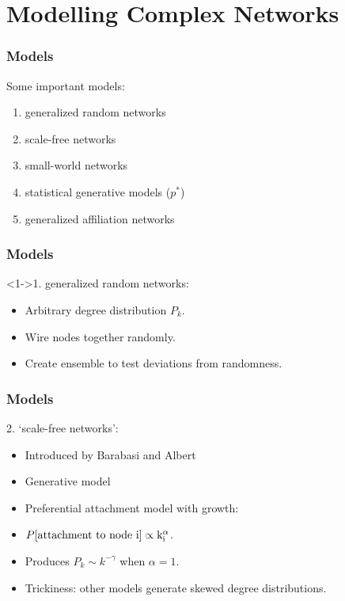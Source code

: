 
\section{Modelling Complex Networks}

\begin{frame}
  \frametitle{Models}

  \begin{block}{Some important models:}
    \begin{enumerate}
    \item<2-> generalized random networks
    \item<3-> scale-free networks
    \item<4-> small-world networks
    \item<5-> statistical generative models ($p^\ast$)
    \item<6-> generalized affiliation networks
    \end{enumerate}
  \end{block}
  
\end{frame}

\begin{frame}
  \frametitle{Models}

  \begin{block}<1->{1. generalized random networks:}
    \begin{itemize}
    \item<2-> Arbitrary degree distribution $P_k$.
    \item<3-> Wire nodes together randomly.
    \item<4-> Create ensemble to test deviations from randomness.
    \end{itemize}
  \end{block}
  
\end{frame}

\begin{frame}
  \frametitle{Models}

  \begin{block}{2. `scale-free networks':}
    \begin{itemize}
    \item<2-> Introduced by Barabasi and Albert\cite{barabasi1999a}
    \item<2-> Generative model
    \item<3-> Preferential attachment model with growth:
    \item<4->  $P[\rm \mbox{attachment to node}\ i] \propto k_{i}^\alpha$.
    \item<5-> Produces \alert{$P_k \sim k^{-\gamma}$} when $\alpha=1$.
    \item<6-> Trickiness: other models generate skewed degree distributions.
    \end{itemize}
  \end{block}

\end{frame}

